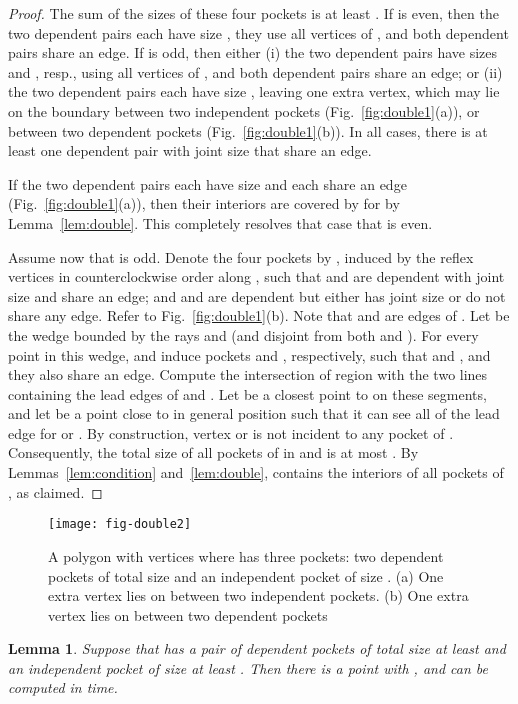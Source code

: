 \documentclass[12pt]{article}
\newtheorem{lemma}{Lemma}
\begin{document}
\begin{proof}
The sum of the sizes of these four pockets is at least . If  is even, then the two dependent pairs each have size , they use all  vertices of , and both dependent pairs share an edge. If  is odd, then either (i) the two dependent pairs have sizes  and , resp., using all  vertices of , and both dependent pairs share an edge; or (ii) the two dependent pairs each have size , leaving one extra vertex, which may lie on the boundary between two independent pockets (Fig.~\ref{fig:double1}(a)), or between two dependent pockets (Fig.~\ref{fig:double1}(b)). In all cases, there is at least one dependent pair with joint size  that share an edge.

If the two dependent pairs each have size  and each share an edge (Fig.~\ref{fig:double1}(a)), then their interiors are covered by  for  by Lemma~\ref{lem:double}.
This completely resolves that case that  is even.

Assume now that  is odd. Denote the four pockets by , induced by the reflex vertices  in counterclockwise order along , such that  and  are dependent with joint size  and share an edge; and  and  are dependent but either has joint size  or do not share any edge. Refer to Fig.~\ref{fig:double1}(b). Note that  and  are edges of . Let  be the wedge bounded by the rays  and  (and disjoint from both  and ). For every point  in this wedge,  and  induce pockets  and , respectively, such that  and , and they also share an edge. Compute the intersection of region  with the two lines containing the lead edges of  and .
Let  be a closest point to  on these segments, and let  be a point close to  in general position such that it can see all of the lead edge for  or . By construction, vertex  or  is not incident to any pocket of . Consequently, the total size of all pockets of  in  and  is at most . By Lemmas~\ref{lem:condition} and~\ref{lem:double},  contains the interiors
of all pockets of , as claimed.
\end{proof}

\begin{figure}[htp]
  \centering
  \texttt{[image: fig-double2]}
  \caption{\label{fig:double2}
A polygon  with  vertices where  has three pockets: two dependent pockets of total size  and an independent pocket of size .
(a) One extra vertex lies on  between two independent pockets.
(b) One extra vertex lies on  between two dependent pockets}
\end{figure}

\begin{lemma}\label{lem:violate2}
Suppose that  has a pair of dependent pockets of total size at least  and
an independent pocket of size at least . Then there is a point  with
, and  can be computed in  time.
\end{lemma}
\end{document}
